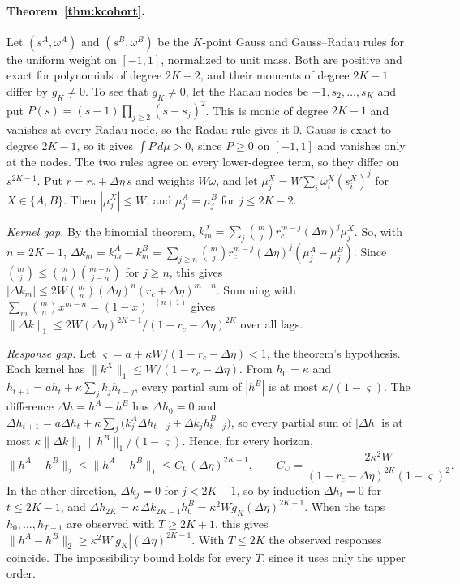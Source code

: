 \paragraph{Theorem~\ref{thm:kcohort}.} Let $(s^A,\omega^A)$ and $(s^B,\omega^B)$ be the $K$-point Gauss and Gauss--Radau rules for the uniform weight on $[-1,1]$, normalized to unit mass. Both are positive and exact for polynomials of degree $2K-2$, and their moments of degree $2K-1$ differ by $g_K\neq0$. To see that $g_K\ne0$, let the Radau nodes be $-1,s_2,\ldots,s_K$ and put $P(s)=(s+1)\prod_{j\ge2}(s-s_j)^2$. This is monic of degree $2K-1$ and vanishes at every Radau node, so the Radau rule gives it $0$. Gauss is exact to degree $2K-1$, so it gives $\int P\,d\mu>0$, since $P\ge0$ on $[-1,1]$ and vanishes only at the nodes. The two rules agree on every lower-degree term, so they differ on $s^{2K-1}$. Put $r=r_c+\Delta\eta\,s$ and weights $W\omega$, and let $\mu^X_j=W\sum_i\omega^X_i(s^X_i)^j$ for $X\in\{A,B\}$. Then $|\mu^X_j|\le W$, and $\mu^A_j=\mu^B_j$ for $j\le2K-2$.

\emph{Kernel gap.} By the binomial theorem, $k^X_m=\sum_j\binom mj r_c^{m-j}(\Delta\eta)^j\mu^X_j$. So, with $n=2K-1$, $\Delta k_m=k^A_m-k^B_m=\sum_{j\ge n}\binom mj r_c^{m-j}(\Delta\eta)^j(\mu^A_j-\mu^B_j)$. Since $\binom mj\le\binom mn\binom{m-n}{j-n}$ for $j\ge n$, this gives $|\Delta k_m|\le2W\binom mn(\Delta\eta)^n(r_c+\Delta\eta)^{m-n}$. Summing with $\sum_m\binom mn x^{m-n}=(1-x)^{-(n+1)}$ gives $\|\Delta k\|_1\le2W(\Delta\eta)^{2K-1}/(1-r_c-\Delta\eta)^{2K}$ over all lags.

\emph{Response gap.} Let $\varsigma=a+\kappa W/(1-r_c-\Delta\eta)<1$, the theorem's hypothesis. Each kernel has $\|k^X\|_1\le W/(1-r_c-\Delta\eta)$. From $h_0=\kappa$ and $h_{t+1}=ah_t+\kappa\sum_jk_jh_{t-j}$, every partial sum of $|h^B|$ is at most $\kappa/(1-\varsigma)$. The difference $\Delta h=h^A-h^B$ has $\Delta h_0=0$ and $\Delta h_{t+1}=a\Delta h_t+\kappa\sum_j\bigl(k^A_j\Delta h_{t-j}+\Delta k_jh^B_{t-j}\bigr)$, so every partial sum of $|\Delta h|$ is at most $\kappa\|\Delta k\|_1\|h^B\|_1/(1-\varsigma)$. Hence, for every horizon,
\[
\|h^A-h^B\|_2\le\|h^A-h^B\|_1\le C_U(\Delta\eta)^{2K-1},\qquad C_U=\frac{2\kappa^2W}{(1-r_c-\Delta\eta)^{2K}(1-\varsigma)^2}.
\]
In the other direction, $\Delta k_j=0$ for $j<2K-1$, so by induction $\Delta h_t=0$ for $t\le2K-1$, and $\Delta h_{2K}=\kappa\,\Delta k_{2K-1}h^B_0=\kappa^2Wg_K(\Delta\eta)^{2K-1}$. When the taps $h_0,\ldots,h_{T-1}$ are observed with $T\ge2K+1$, this gives $\|h^A-h^B\|_2\ge\kappa^2W|g_K|(\Delta\eta)^{2K-1}$. With $T\le2K$ the observed responses coincide. The impossibility bound holds for every $T$, since it uses only the upper order.

